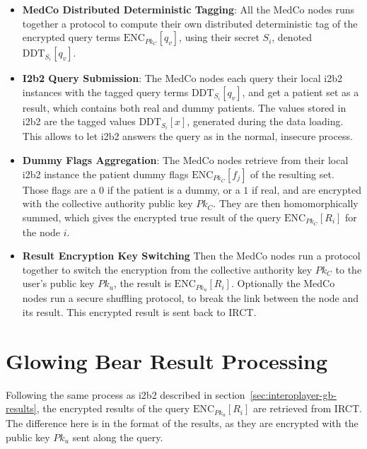 \begin{itemize}

\item \textbf{MedCo Distributed Deterministic Tagging}:
All the MedCo nodes runs together a protocol to compute their own distributed deterministic tag of the encrypted query terms $\text{ENC}_{Pk_C}[q_v]$, using their secret $S_i$, denoted $\text{DDT}_{S_i}[q_v]$.

\item \textbf{I2b2 Query Submission}:
The MedCo nodes each query their local i2b2 instances with the tagged query terms $\text{DDT}_{S_i}[q_v]$, and get a patient set as a result, which contains both real and dummy patients.
The values stored in i2b2 are the tagged values $\text{DDT}_{S_i}[x]$, generated during the data loading. 
This allows to let i2b2 answers the query as in the normal, insecure process.

\item \textbf{Dummy Flags Aggregation}:
The MedCo nodes retrieve from their local i2b2 instance the patient dummy flags $\text{ENC}_{Pk_C}[f_j]$ of the resulting set.
Those flags are a $0$ if the patient is a dummy, or a $1$ if real, and are encrypted with the collective authority public key $Pk_C$.
They are then homomorphically summed, which gives the encrypted true result of the query $\text{ENC}_{Pk_C}[R_i]$ for the node $i$.

\item \textbf{Result Encryption Key Switching}
Then the MedCo nodes run a protocol together to switch the encryption from the collective authority key $Pk_C$ to the user's public key $Pk_u$, the result is $\text{ENC}_{Pk_u}[R_i]$.
Optionally the MedCo nodes run a secure shuffling protocol, to break the link between the node and its result.
This encrypted result is sent back to IRCT.

\end{itemize}

\label{sec:medco-process}


\section{Glowing Bear Result Processing}

Following the same process as i2b2 described in section~\ref{sec:interoplayer-gb-results}, the encrypted results of the query $\text{ENC}_{Pk_u}[R_i]$ are retrieved from IRCT.
The difference here is in the format of the results, as they are encrypted with the public key $Pk_u$ sent along the query.

